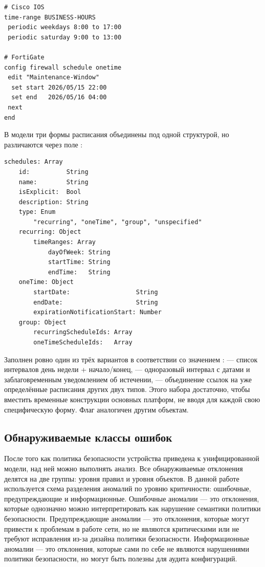 \begin{verbatim}
# Cisco IOS
time-range BUSINESS-HOURS
 periodic weekdays 8:00 to 17:00
 periodic saturday 9:00 to 13:00

# FortiGate
config firewall schedule onetime
 edit "Maintenance-Window"
  set start 2026/05/15 22:00
  set end   2026/05/16 04:00
 next
end
\end{verbatim}

В модели три формы расписания объединены под одной структурой, но различаются через поле :

\begin{lstlisting}[style=schemastyle]
schedules: Array
    id:          String
    name:        String
    isExplicit:  Bool
    description: String
    type: Enum
        "recurring", "oneTime", "group", "unspecified"
    recurring: Object
        timeRanges: Array
            dayOfWeek: String
            startTime: String
            endTime:   String
    oneTime: Object
        startDate:                  String
        endDate:                    String
        expirationNotificationStart: Number
    group: Object
        recurringScheduleIds: Array
        oneTimeScheduleIds:   Array
\end{lstlisting}

Заполнен ровно один из трёх вариантов в соответствии со значением :  --- список интервалов день недели + начало/конец,  --- одноразовый интервал с датами и заблаговременным уведомлением об истечении,  --- объединение ссылок на уже определённые расписания других двух типов. Этого набора достаточно, чтобы вместить временные конструкции основных платформ, не вводя для каждой свою специфическую форму. Флаг  аналогичен другим объектам.

\subsection{Обнаруживаемые классы ошибок}
\label{sec:Section3:errors}

После того как политика безопасности устройства приведена к унифицированной модели, над ней можно выполнять анализ. Все обнаруживаемые отклонения делятся на две группы: уровня правил и уровня объектов.
В данной работе используется схема разделения аномалий по уровню критичности: ошибочные, предупреждающие и информационные. Ошибочные аномалии --- это отклонения, которые однозначно можно интерпретировать как нарушение семантики политики безопасности. Предупреждающие аномалии --- это отклонения, которые могут привести к проблемам в работе сети, но не являются критическими или не требуют исправления из-за дизайна политики безопасности. Информационные аномалии --- это отклонения, которые сами по себе не являются нарушениями политики безопасности, но могут быть полезны для аудита конфигураций.

